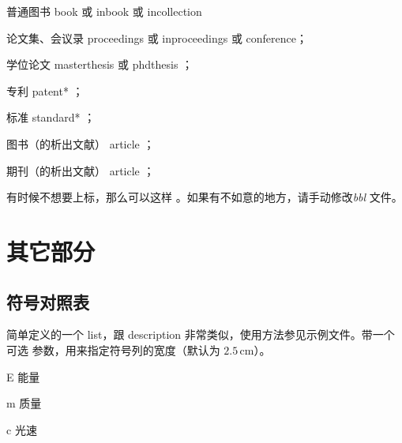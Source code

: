 
普通图书 book
\cite{cdy, hlswedl, bjszxmzhzjwyh,qgxxywxbzhjswyh,xgx, gyw, wfz, zgdylsdag, zxg, tjdxtmgcfzgjzdsys,zgzzxh,peebles,baldock,sommers}
 或 inbook 或 incollection

论文集、会议录 proceedings \cite{nzm, yufin, jdq} 或 inproceedings 或 conference；


学位论文 masterthesis 或 phdthesis
\cite{mh, ding2001, cairns1965}；

专利 patent*
\cite{jiang1989}；

标准 standard*
\cite{gb6447}；

图书（的析出文献） article
\cite{cgw,cjb, mks, weinstein, roberson}；

期刊（的析出文献） article
\cite{chen2001, nadkarni1992, hua1973}；





有时候不想要上标，那么可以这样 。如果有不如意的地方，请手动修改\emph{bbl} 文件。


\section{其它部分}
\label{sec:otherparts}

\subsection*{符号对照表}

简单定义的一个 list，跟 description 非常类似，使用方法参见示例文件。带一个可选
参数，用来指定符号列的宽度（默认为 $2.5\,\mathrm{cm}$）。
\begin{code}
\begin{denotation}[1.5cm]
  \item[E] 能量
  \item[m] 质量
  \item[c] 光速
\end{denotation}
\end{code}

